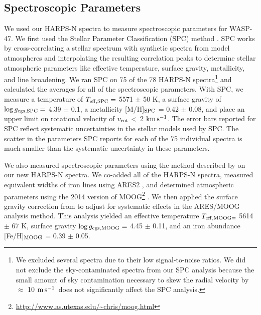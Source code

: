 \documentclass{emulateapj}
\newcommand{\ron}{\color{black}}
\newcommand{\thisstar}{WASP-47}
\newcommand{\kms}{\ensuremath{\rm km\,s^{-1}}}
\newcommand{\ms}{\ensuremath{\rm m\,s^{-1}}}
\begin{document}
\subsection{Spectroscopic Parameters}
\label{sec:spec_prop}
We used our HARPS-N spectra to measure spectroscopic parameters for \thisstar. We first used the Stellar Parameter Classification (SPC) method \citep[][]{buchhave, buchhave14}. SPC works by cross-correlating a stellar spectrum with synthetic spectra from \citet{kurucz} model atmospheres and interpolating the resulting correlation peaks to determine stellar atmospheric parameters like effective temperature, surface gravity, metallicity, and line broadening. We ran SPC on 75 of the 78 HARPS-N spectra\footnote{We excluded several spectra due to their low signal-to-noise ratios. {\ron We did not exclude the sky-contaminated spectra from our SPC analysis because the small amount of sky contamination necessary to skew the radial velocity by $\approx$ 10 \ms\ does not significantly affect the SPC analysis.}} and calculated the averages for all of the spectroscopic parameters. With SPC, we measure a temperature of $T_{\rm eff, SPC }=$ 5571 $\pm$ 50 K, a surface gravity of $\log{g_{\rm cgs, SPC}}= $ 4.39 $\pm$ 0.1, a metallicity [M/H]$_{\rm SPC}$ = 0.42 $\pm$ 0.08, and place an upper limit on rotational velocity of $v_{\rm rot}$ \textless\ 2 \kms. The error bars reported for SPC reflect systematic uncertainties in the stellar models used by SPC. The scatter in the parameters SPC reports for each of the 75 individual spectra is much smaller than the systematic uncertainty in these parameters.   

We also measured spectroscopic parameters using the method described by \citet{mortier} on our new HARPS-N spectra. We co-added all of the HARPS-N spectra, measured equivalent widths of iron lines using ARES2 \citep{sousa, ares2}, and determined atmospheric parameters using the 2014 version of MOOG\footnote{\url{http://www.as.utexas.edu/~chris/moog.html}} \citep{sneden1973}. We then applied the surface gravity correction from \citet{mortier14} to adjust for systematic effects in the ARES/MOOG analysis method. This analysis yielded an effective temperature $T_{\rm eff, MOOG =}$ 5614 $\pm$ 67 K, surface gravity $\log{g_{\rm cgs, MOOG}}= $ 4.45 $\pm$ 0.11, and an iron abundance [Fe/H]$_{\rm MOOG}$ = 0.39 $\pm$ 0.05.
\end{document}
